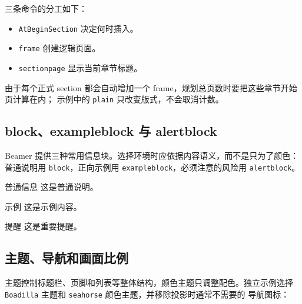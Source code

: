 \begin{codeblock}
\AtBeginSection[]{
    \begin{frame}[plain]
        \sectionpage
    \end{frame}
}
\end{codeblock}

三条命令的分工如下：
\begin{itemize}
    \item \texttt{AtBeginSection} 决定何时插入。
    \item \texttt{frame} 创建逻辑页面。
    \item \texttt{sectionpage} 显示当前章节标题。
\end{itemize}
由于每个正式 section 都会自动增加一个 frame，规划总页数时要把这些章节开始页计算在内；
示例中的 \texttt{plain} 只改变版式，不会取消计数。

\subsection{block、exampleblock 与 alertblock}

Beamer 提供三种常用信息块。选择环境时应依据内容语义，而不是只为了颜色：
普通说明用 \texttt{block}，正向示例用 \texttt{exampleblock}，必须注意的风险用
\texttt{alertblock}。

\begin{codeblock}
\begin{block}{普通信息}
这是普通说明。
\end{block}

\begin{exampleblock}{示例}
这是示例内容。
\end{exampleblock}

\begin{alertblock}{提醒}
这是重要提醒。
\end{alertblock}
\end{codeblock}

\subsection{主题、导航和画面比例}

主题控制标题栏、页脚和列表等整体结构，颜色主题只调整配色。独立示例选择
\texttt{Boadilla} 主题和 \texttt{seahorse} 颜色主题，并移除投影时通常不需要的
导航图标：

